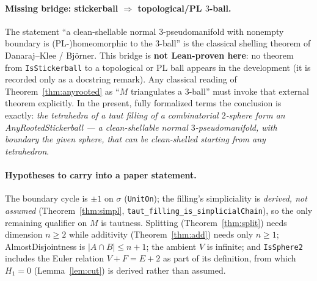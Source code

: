 \documentclass[11pt]{article}
\theoremstyle{plain}
\theoremstyle{definition}
\theoremstyle{remark}
\newcommand{\code}[1]{\texttt{#1}}
\newcommand{\card}[1]{\lvert #1\rvert}
\begin{document}
\paragraph{Missing bridge: stickerball $\Rightarrow$ topological/PL $3$-ball.}
The statement ``a clean-shellable normal $3$-pseudomanifold with nonempty boundary is
(PL-)homeomorphic to the $3$-ball'' is the classical shelling theorem of Danaraj--Klee /
Bj\"orner. This bridge is \textbf{not Lean-proven here}: no theorem from \code{IsStickerball} to
a topological or PL ball appears in the development (it is recorded only as a docstring remark).
Any classical reading of Theorem~\ref{thm:anyrooted} as ``$M$ triangulates a $3$-ball'' must
invoke that external theorem explicitly. In the present, fully formalized terms the conclusion is exactly:
\emph{the tetrahedra of a taut filling of a combinatorial $2$-sphere form an
AnyRootedStickerball --- a clean-shellable normal $3$-pseudomanifold, with boundary the given
sphere, that can be clean-shelled starting from any tetrahedron}.

\paragraph{Hypotheses to carry into a paper statement.}
The boundary cycle is $\pm1$ on $\sigma$ (\code{UnitOn}); the filling's simpliciality is
\emph{derived, not assumed} (Theorem~\ref{thm:simpl}, \code{taut\_filling\_is\_simplicialChain}),
so the only remaining qualifier on $M$ is tautness. Splitting (Theorem~\ref{thm:split}) needs
dimension $n\ge 2$ while additivity (Theorem~\ref{thm:add}) needs only $n\ge 1$;
AlmostDisjointness is
$\card{A\cap B}\le n+1$; the ambient $V$ is infinite; and \code{IsSphere2} includes the Euler
relation $V+F=E+2$ as part of its definition, from which $H_1=0$ (Lemma~\ref{lem:cut}) is
derived rather than assumed.
\end{document}
